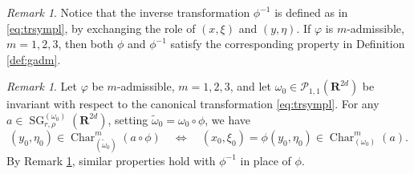 \documentclass[12pt,a4paper,reqno]{amsart}
\numberwithin{equation}{section}
\numberwithin{thm}{section}
\theoremstyle{definition}
\theoremstyle{remark}
\newtheorem{rem}[thm]{Remark}
\begin{document}
\par

\begin{rem}\label{rem:invtransf}
Notice that the inverse transformation $\phi^{-1}$ is defined as in
\eqref{eq:trsympl}, by exchanging the role of $(x,\xi)$ and $(y,\eta)$.
If $\varphi$ is $m$-admissible, $m=1,2,3$, then
both $\phi$ and $\phi^{-1}$ satisfy the corresponding property in
Definition \ref{def:gadm}.
\end{rem}

\par

\begin{rem}\label{rem:transfchar}
Let $\varphi$ be $m$-admissible, $m=1,2,3$, and let $\omega _0\in
\mathscr P_{1,1}({\mathbf R^{{2d}}})$ be invariant with respect to the canonical transformation
\eqref{eq:trsympl}.
For any $a\in {\operatorname{SG}} ^{(\omega _0)} _{r,\rho }({\mathbf R^{{2d}}})$, setting $\widetilde{\omega}_0=
\omega_0\circ\phi$, we have
\[
	(y_0,\eta_0)\in{\operatorname{Char}}^m_{(\widetilde{\omega}_0)}(a\circ\phi) 
	\quad \Longleftrightarrow \quad 
	(x_0,\xi_0)=\phi(y_0,\eta_0)\in{\operatorname{Char}}^m_{(\omega_0)}(a).
\]
By Remark \ref{rem:invtransf}, similar properties hold with
$\phi^{-1}$ in place of $\phi$.
\end{rem}

\par
\end{document}
